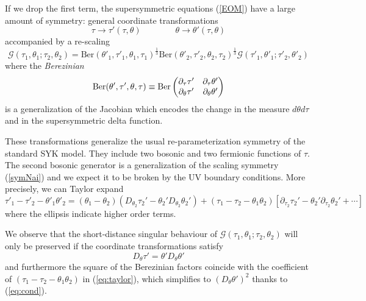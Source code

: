\documentclass[aps,pre,preprint,onecolumn,citeautoscript,superscriptaddress,nofootinbib,eqsecnum]{revtex4-1}
\begin{document}
If we drop the first term, the supersymmetric equations (\ref{EOM}) have a large amount of symmetry: general coordinate transformations 
\begin{equation}
\tau \to \tau'(\tau, \theta) \qquad \qquad \theta \to \theta'(\tau, \theta)
\end{equation}
accompanied by a re-scaling 
\begin{equation}
\mathcal{G}(\tau_1,\theta_1;\tau_2,\theta_2) = \mathrm{Ber} (\theta'_1, \tau'_1,\theta_1, \tau_1)^{\frac13} \mathrm{Ber} (\theta'_2, \tau'_2,\theta_2, \tau_2)^{\frac13} \mathcal{G}(\tau'_1,\theta'_1;\tau'_2,\theta'_2)
\end{equation}
where the {\it Berezinian} 
\begin{equation}
\mathrm{Ber} (\theta', \tau',\theta, \tau) \equiv \mathrm{Ber} \begin{pmatrix}\partial_\tau \tau' &  \partial_\tau \theta'  \cr \partial_\theta \tau' & \partial_\theta \theta'  \end{pmatrix} 
\end{equation}
is a generalization of the Jacobian which encodes the change in the measure $d\theta d\tau$ and in the supersymmetric delta function. 

These transformations generalize the usual re-parameterization symmetry of the standard SYK model. They include two bosonic and two fermionic 
functions of $\tau$. The second bosonic generator is a generalization of the scaling symmetry (\ref{symNai}) and we expect it to be broken by the UV boundary conditions. 
More precisely, we can Taylor expand 
\begin{equation}\label{eq:taylor}
\tau'_1 - \tau'_2 - \theta'_1 \theta'_2 = (\theta_1 - \theta_2) \left( D_{\theta_2} \tau_2' - \theta_2' D_{\theta_2} \theta_2'\right) + (\tau_1 - \tau_2 - \theta_1 \theta_2) \left[  \partial_{\tau_2} \tau_2' - \theta_2' \partial_{\tau_2} \theta_2'+ \cdots \right]
\end{equation}
where the ellipsis indicate higher order terms. 

We observe that the short-distance singular behaviour of $\mathcal{G}(\tau_1,\theta_1;\tau_2,\theta_2)$ will only be preserved if 
the coordinate transformations satisfy 
\begin{equation} \label{eq:cond}
D_{\theta} \tau' = \theta' D_{\theta} \theta'
\end{equation}
and furthermore the square of the Berezinian factors coincide with the coefficient of $(\tau_1 - \tau_2 - \theta_1 \theta_2)$ in (\ref{eq:taylor}),
which simplifies to $(D_\theta \theta')^2$ thanks to (\ref{eq:cond}).
\end{document}
